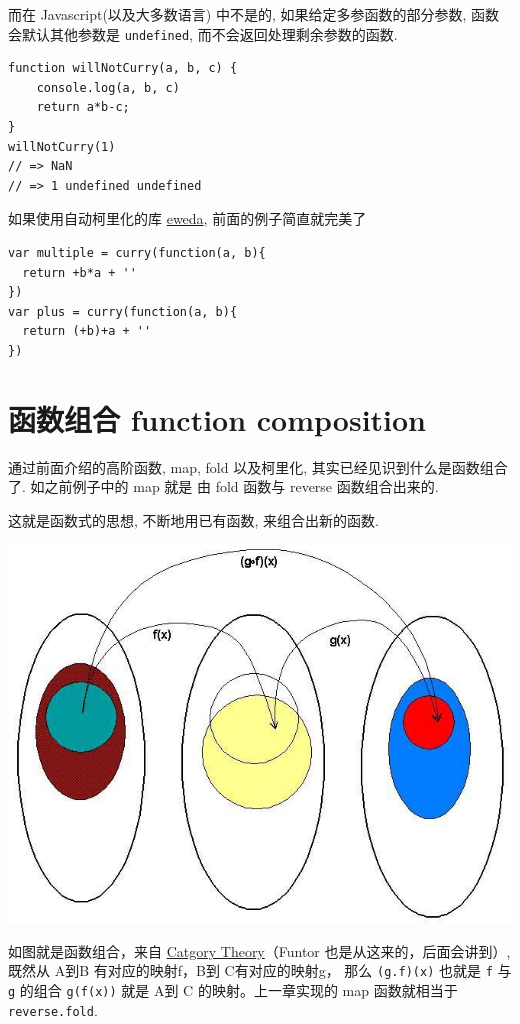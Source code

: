 \documentclass[a5paper]{book}
\begin{document}
而在 Javascript(以及大多数语言) 中不是的, 如果给定多参函数的部分参数,
函数会默认其他参数是 \texttt{undefined}, 而不会返回处理剩余参数的函数.

\begin{verbatim}
function willNotCurry(a, b, c) {
    console.log(a, b, c)
    return a*b-c;
}
willNotCurry(1)
// => NaN
// => 1 undefined undefined
\end{verbatim}

如果使用自动柯里化的库 \href{https://github.com/CrossEye/eweda}{eweda},
前面的例子简直就完美了

\begin{verbatim}
var multiple = curry(function(a, b){
  return +b*a + ''
})
var plus = curry(function(a, b){
  return (+b)+a + ''
})
\end{verbatim}

\chapter{函数组合 function composition}
\label{sec:orgheadline22}

通过前面介绍的高阶函数, map, fold 以及柯里化,
其实已经见识到什么是函数组合了. 如之前例子中的 map 就是 由 fold 函数与
reverse 函数组合出来的.

这就是函数式的思想, 不断地用已有函数, 来组合出新的函数.

\includegraphics[width=.9\linewidth]{./images/higherorder/composition.jpg}

如图就是函数组合，来自
\href{https://en.wikipedia.org/wiki/Category_theory}{Catgory Theory}（Funtor 也是从这来的，后面会讲到）, 既然从 A到B
有对应的映射f，B到 C有对应的映射g， 那么 \texttt{(g.f)(x)} 也就是 \texttt{f} 与 \texttt{g}
的组合 \texttt{g(f(x))} 就是 A到 C 的映射。上一章实现的 map 函数就相当于
\texttt{reverse.fold}.
\end{document}
